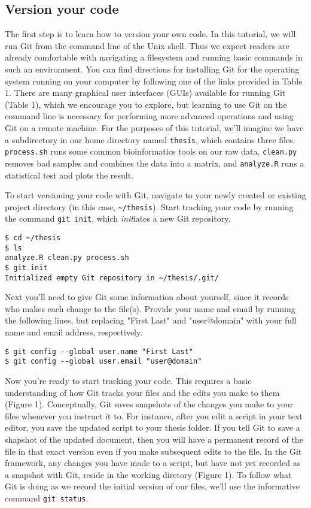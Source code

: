 \subsection{Version your code}

The first step is to learn how to version your own code.
In this tutorial, we will run Git from the command line of the Unix shell.
Thus we expect readers are already comfortable with navigating a filesystem and running basic commands in such an environment.
You can find directions for installing Git for the operating system running on your computer by following one of the links provided in Table 1.
There are many graphical user interfaces (GUIs) available for running Git (Table 1), which we encourage you to explore, but learning to use Git on the command line is necessary for performing more advanced operations and using Git on a remote machine.
For the purposes of this tutorial, we'll imagine we have a subdirectory in our home directory named \verb|thesis|, which contains three files.
\verb|process.sh| runs some common bioinformatics tools on our raw data, \verb|clean.py| removes bad samples and combines the data into a matrix, and \verb|analyze.R| runs a statistical test and plots the result.

To start versioning your code with Git, navigate to your newly created or existing project directory (in this case, \verb|~/thesis|).
Start tracking your code by running the command \verb|git init|, which \textit{init}iates a new Git repository.

\begin{lstlisting}
$ cd ~/thesis
$ ls
analyze.R clean.py process.sh
$ git init
Initialized empty Git repository in ~/thesis/.git/
\end{lstlisting}

Next you'll need to give Git some information about yourself, since it records who makes each change to the file(s).
Provide your name and email by running the following lines, but replacing "First Last" and "user@domain" with your full name and email address, respectively.

\begin{lstlisting}
$ git config --global user.name "First Last"
$ git config --global user.email "user@domain"
\end{lstlisting}

Now you're ready to start tracking your code.
This requires a basic understanding of how Git tracks your files and the edits you make to them (Figure 1).
Conceptually, Git saves snapshots of the changes you make to your files whenever you instruct it to.
For instance, after you edit a script in your text editor, you save the updated script to your thesis folder.
If you tell Git to save a shapshot of the updated document, then you will have a permanent record of the file in that exact version even if you make subsequent edits to the file.
In the Git framework, any changes you have made to a script, but have not yet recorded as a snapshot with Git, reside in the working diretory (Figure 1).
To follow what Git is doing as we record the initial version of our files, we'll use the informative command \verb|git status|.

